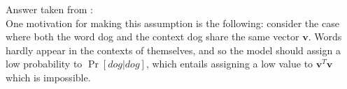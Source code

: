 Answer taken from \cite{Goldberg2014word2vecED}: \\
One motivation for making this assumption is the following:
consider the case where both the word dog and the context dog share the same vector $\bm v$. 
Words hardly appear in the contexts of themselves, and so the model should assign a low probability to
$\Pr[dog | dog]$, which entails assigning a low value to $\bm v^T \bm v$ which is impossible.